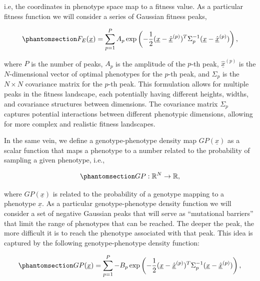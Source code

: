 \documentclass[
]{scrartcl}
\begin{document}
i.e, the coordinates in phenotype space map to a fitness value. As a
particular fitness function we will consider a series of Gaussian
fitness peaks,

\begin{equation}\phantomsection\label{eq-fitness-landscape-gaussian}{
F_E(\underline{x}) = 
\sum_{p=1}^P A_p 
\exp\left(
    -\frac{1}{2}
    (\underline{x} - \underline{\hat{x}}^{(p)})^T 
    \Sigma_p^{-1} 
    (\underline{x} - \underline{\hat{x}}^{(p)})
\right),
}\end{equation}

where \(P\) is the number of peaks, \(A_p\) is the amplitude of the
\(p\)-th peak, \(\underline{\hat{x}}^{(p)}\) is the \(N\)-dimensional
vector of optimal phenotypes for the \(p\)-th peak, and \(\Sigma_p\) is
the \(N \times N\) covariance matrix for the \(p\)-th peak. This
formulation allows for multiple peaks in the fitness landscape, each
potentially having different heights, widths, and covariance structures
between dimensions. The covariance matrix \(\Sigma_p\) captures
potential interactions between different phenotypic dimensions, allowing
for more complex and realistic fitness landscapes.

In the same vein, we define a genotype-phenotype density map
\(GP(\underline{x})\) as a scalar function that maps a phenotype to a
number related to the probability of sampling a given phenotype, i.e.,

\begin{equation}\phantomsection\label{eq-genotype-phenotype-density}{
GP: \mathbb{R}^N \to \mathbb{R},
}\end{equation}

where \(GP(\underline{x})\) is related to the probability of a genotype
mapping to a phenotype \(\underline{x}\). As a particular
genotype-phenotype density function we will consider a set of negative
Gaussian peaks that will serve as ``mutational barriers'' that limit the
range of phenotypes that can be reached. The deeper the peak, the more
difficult it is to reach the phenotype associated with that peak. This
idea is captured by the following genotype-phenotype density function:

\begin{equation}\phantomsection\label{eq-genotype-phenotype-density-gaussian}{
GP(\underline{x}) = 
\sum_{p=1}^P -B_p 
\exp\left(
    -\frac{1}{2}(\underline{x} - \underline{\hat{x}}^{(p)})^T 
    \Sigma_p^{-1} 
    (\underline{x} - \underline{\hat{x}}^{(p)})
\right),
}\end{equation}
\end{document}
